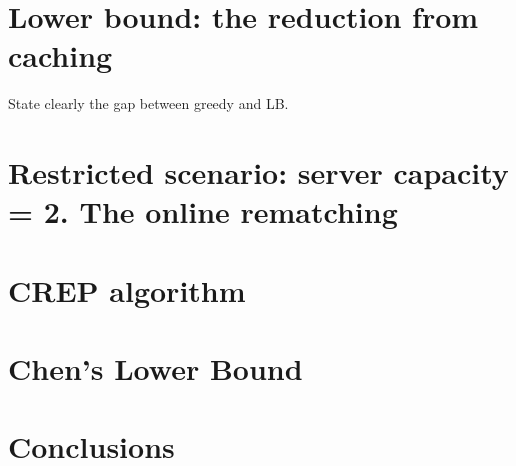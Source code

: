 \section{Lower bound: the reduction from caching}
State clearly the gap between greedy and LB. 
\section{Restricted scenario: server capacity = 2. The online rematching}
\section{CREP algorithm}
\section{Chen's Lower Bound}
\section{Conclusions}


